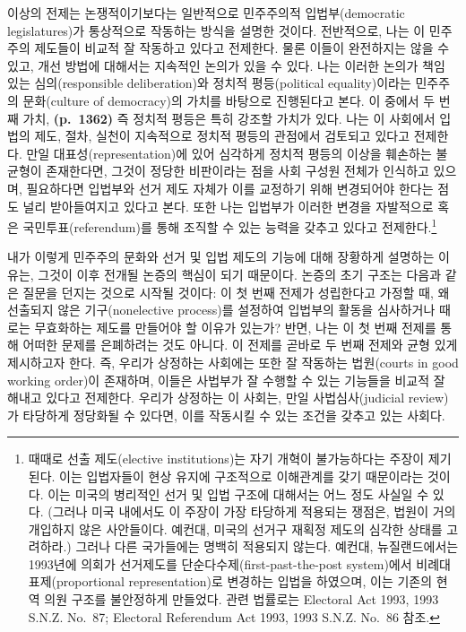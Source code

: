 \documentclass[a4paper,12pt,oneside]{article}  %
\begin{document}
이상의 전제는 논쟁적이기보다는 일반적으로 민주주의적 입법부(democratic
legislatures)가 통상적으로 작동하는 방식을 설명한 것이다. 전반적으로,
나는 이 민주주의 제도들이 비교적 잘 작동하고 있다고 전제한다. 물론
이들이 완전하지는 않을 수 있고, 개선 방법에 대해서는 지속적인 논의가
있을 수 있다. 나는 이러한 논의가 책임 있는 심의(responsible
deliberation)와 정치적 평등(political equality)이라는 민주주의
문화(culture of democracy)의 가치를 바탕으로 진행된다고 본다. 이 중에서
두 번째 가치, \textbf{(p.~1362)} 즉 정치적 평등은 특히 강조할 가치가
있다. 나는 이 사회에서 입법의 제도, 절차, 실천이 지속적으로 정치적
평등의 관점에서 검토되고 있다고 전제한다. 만일 대표성(representation)에
있어 심각하게 정치적 평등의 이상을 훼손하는 불균형이 존재한다면, 그것이
정당한 비판이라는 점을 사회 구성원 전체가 인식하고 있으며, 필요하다면
입법부와 선거 제도 자체가 이를 교정하기 위해 변경되어야 한다는 점도 널리
받아들여지고 있다고 본다. 또한 나는 입법부가 이러한 변경을 자발적으로
혹은 국민투표(referendum)를 통해 조직할 수 있는 능력을 갖추고 있다고
전제한다.\footnote{때때로 선출 제도(elective institutions)는 자기 개혁이
  불가능하다는 주장이 제기된다. 이는 입법자들이 현상 유지에 구조적으로
  이해관계를 갖기 때문이라는 것이다. 이는 미국의 병리적인 선거 및 입법
  구조에 대해서는 어느 정도 사실일 수 있다. (그러나 미국 내에서도 이
  주장이 가장 타당하게 적용되는 쟁점은, 법원이 거의 개입하지 않은
  사안들이다. 예컨대, 미국의 선거구 재획정 제도의 심각한 상태를
  고려하라.) 그러나 다른 국가들에는 명백히 적용되지 않는다. 예컨대,
  뉴질랜드에서는 1993년에 의회가 선거제도를
  단순다수제(first-past-the-post system)에서 비례대표제(proportional
  representation)로 변경하는 입법을 하였으며, 이는 기존의 현역 의원
  구조를 불안정하게 만들었다. 관련 법률로는 Electoral Act 1993, 1993
  S.N.Z. No.~87; Electoral Referendum Act 1993, 1993 S.N.Z. No.~86 참조.}

내가 이렇게 민주주의 문화와 선거 및 입법 제도의 기능에 대해 장황하게
설명하는 이유는, 그것이 이후 전개될 논증의 핵심이 되기 때문이다. 논증의
초기 구조는 다음과 같은 질문을 던지는 것으로 시작될 것이다: 이 첫 번째
전제가 성립한다고 가정할 때, 왜 선출되지 않은 기구(nonelective
process)를 설정하여 입법부의 활동을 심사하거나 때로는 무효화하는 제도를
만들어야 할 이유가 있는가? 반면, 나는 이 첫 번째 전제를 통해 어떠한
문제를 은폐하려는 것도 아니다. 이 전제를 곧바로 두 번째 전제와 균형 있게
제시하고자 한다. 즉, 우리가 상정하는 사회에는 또한 잘 작동하는
법원(courts in good working order)이 존재하며, 이들은 사법부가 잘 수행할
수 있는 기능들을 비교적 잘 해내고 있다고 전제한다. 우리가 상정하는 이
사회는, 만일 사법심사(judicial review)가 타당하게 정당화될 수 있다면,
이를 작동시킬 수 있는 조건을 갖추고 있는 사회다.
\end{document}
